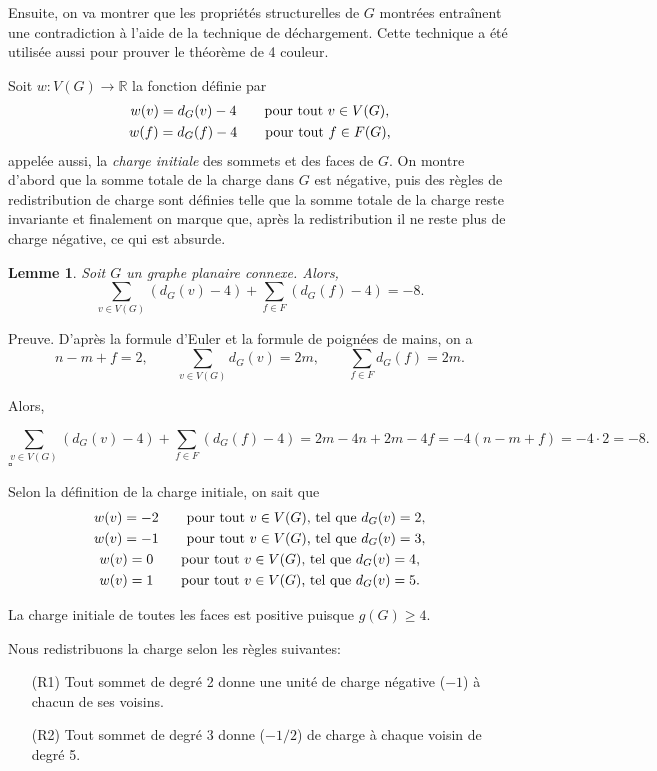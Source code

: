 \documentclass[10pt,a4paper]{article}
\newtheorem{lemme}{Lemme}
\newcommand{\ep}{{\hfill $\square$}}
\begin{document}
\bigskip
Ensuite, on va montrer que les propriétés structurelles de $G$ montrées entraînent une contradiction à l'aide de la technique de déchargement. Cette technique a été utilisée aussi pour prouver le théorème de 4 couleur. 

Soit $w: V(G) \to \mathbb{R}$  la fonction définie par
 $$
 \gathered
 w(v) = d_G(v) - 4 \qquad \textrm{pour tout $v\in V(G)$,} \\
 w(f) = d_G(f) - 4 \qquad \textrm{pour tout $f\in F(G)$,} 
\endgathered 
$$
appelée aussi, la \emph{charge initiale} des sommets et des faces de $G$. On montre d'abord que la somme totale de la charge dans $G$ est négative, puis des règles de redistribution de charge sont définies telle que la somme totale de la charge reste invariante et finalement on marque que, après la redistribution il ne reste plus de charge négative, ce qui est absurde.

\begin{lemme}
Soit $G$ un graphe planaire connexe. Alors,
$$ \sum_{v \in V(G)} (d_G(v) - 4) + \sum_{f\in F} (d_G(f) -4) = -8.$$
\end{lemme}

Preuve.
D'après la formule d'Euler et la formule de poignées de mains, on a
$$ 
n - m + f = 2, \qquad
\sum_{v\in V(G)} d_G(v) = 2m, \qquad
\sum_{f\in F} d_G(f) = 2m. 
$$

Alors,

$$ \sum_{v \in V(G)} (d_G(v) - 4) + \sum_{f\in F} (d_G(f) -4) = 2m -4n + 2m - 4f = -4(n - m + f) = -4\cdot 2 = -8.$$
\ep 

Selon la définition de la charge initiale, on sait que
$$ 
\gathered
w(v) = -2 \qquad \textrm{pour tout $v \in V(G)$, tel que } d_G(v) = 2, \\
w(v) = -1 \qquad \textrm{pour tout $v \in V(G)$, tel que } d_G(v) = 3, \\
w(v) =  0 \qquad \textrm{pour tout $v \in V(G)$, tel que } d_G(v) = 4, \\
w(v) =  1 \qquad \textrm{pour tout $v \in V(G)$, tel que } d_G(v) = 5.
\endgathered
$$

La charge initiale de toutes les faces est positive puisque $g(G)\ge 4$.

Nous redistribuons la charge selon les règles suivantes:
\begin{enumerate}
\item[(R1)] Tout sommet de degré 2 donne une unité de charge négative ($-1$) à chacun de ses voisins.
\item[(R2)] Tout sommet de degré 3 donne ($-1/2$) de charge à chaque voisin de degré 5.
\end{enumerate}
\end{document}
